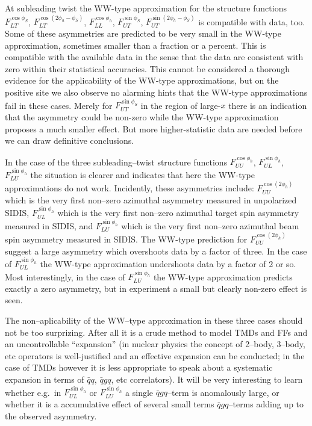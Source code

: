 \documentclass[a4paper,11pt]{article}
\begin{document}
At subleading twist the WW-type approximation for the
structure functions 
	$F_{LT}^{\cos\phi_S}$,
	$F_{LT}^{\cos(2\phi_h-\phi_S)}$,
	$F_{LL}^{\cos\phi_h}$,
	$F_{UT}^{\sin\phi_S}$,
	$F_{UT}^{\sin(2\phi_h-\phi_S)}$
is compatible with data, too. Some of these asymmetries are
predicted to be very small in the WW-type approximation,
sometimes smaller than a fraction or a percent. This is
compatible with the available data in the sense that the
data are consistent with zero within their statistical
accuracies. This cannot be considered a thorough evidence
for the applicability of the WW-type approximations, but
on the positive site we also observe no alarming hints
that the WW-type approximations fail in these cases.
Merely for $F_{UT}^{\sin\phi_S}$ in the region of large-$x$
there is an indication that the asymmetry could be 
non-zero while the WW-type approximation proposes
a much smaller effect. But more higher-statistic data 
are needed before we can draw definitive conclusions.

In the case of the three subleading--twist structure functions 
	$F_{UU}^{\cos\phi_h}$, 
	$F_{UL}^{\sin\phi_h}$,
	$F_{LU}^{\sin\phi_h}$
the situation is clearer and indicates that here the WW-type
approximations do not work.
Incidently, these asymmetries include: 	$F_{UU}^{\cos(2\phi_h)}$ which 
is the very first non--zero azimuthal asymmetry measured in unpolarized SIDIS,
$F_{UL}^{\sin\phi_h}$ which is the very first non--zero azimuthal target spin 
asymmetry measured in SIDIS, and $F_{LU}^{\sin\phi_h}$ which is the 
very first non--zero azimuthal beam spin asymmetry measured in SIDIS.
The WW-type prediction for $F_{UU}^{\cos(2\phi_h)}$ suggest a large asymmetry
which overshoots data by a factor of three. In the case of $F_{UL}^{\sin\phi_h}$
the WW-type approximation undershoots data by a factor of 2 or so.
Most interestingly, in the case of $F_{LU}^{\sin\phi_h}$ the WW-type
approximation predicts exactly a zero asymmetry, but in experiment
a small but clearly non-zero effect is seen.

The non--aplicability of the WW--type approximation in these three
cases should not be too surprizing. After all it is a crude method
to model TMDs and FFs and an uncontrollable ``expansion''
(in nuclear physics the concept of 2--body, 3--body, etc operators
is well-justified and an effective expansion can be conducted; in
the case of TMDs however it is less appropriate to speak about a
systematic expansion in terms of $\bar{q}q$, $\bar{q}gq$, etc 
correlators). It will be very interesting to learn whether e.g.\ 
in $F_{UL}^{\sin\phi_h}$ or $F_{LU}^{\sin\phi_h}$ a single $\bar{q}gq$--term 
is anomalously large, or whether it is a accumulative effect of 
several small terms $\bar{q}gq$--terms adding up to the observed asymmetry.
\end{document}
